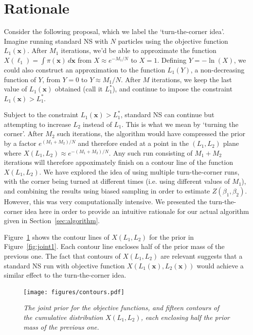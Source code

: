 \documentclass[journal,article,accept,moreauthors,pdftex,12pt,a4paper]{mdpi}
\newcommand{\xx}{\boldsymbol{x}}
\begin{document}
\section{Rationale}\label{sec:rationale}

Consider the following proposal, which we label the `turn-the-corner idea'.
Imagine running standard NS with $N$ particles
using the objective function $L_1(\xx)$.
After $M_1$ iterations, we'd be able to approximate
the function $X(\ell_1) = \int \pi(\xx) \, d\xx$
from $X\approx e^{-M_1/N}$ to $X=1$. Defining $Y=-\ln(X)$, we could also
construct an approximation to the function
$L_1(Y)$, a non-decreasing function of $Y$, from $Y=0$ to $Y\approx M_1/N$.
After $M$ iterations, we keep the last value of $L_1(\xx)$ obtained
(call it $L_1^*$), and continue to impose the constraint $L_1(\xx) > L_1^*$.

Subject to the constraint $L_1(\xx) > L_1^*$, standard NS can continue but
attempting to increase $L_2$ instead of $L_1$. This is what we mean by
`turning the corner'. After $M_2$ such iterations,
the algorithm would have compressed the prior by a factor
$e^{(M_1 + M_2)/N}$ and therefore ended at a point in the $(L_1, L_2)$ plane
where $X(L_1, L_2) \approx e^{-(M_1 + M_2)/N}$. Any such run consisting of
$M_1 + M_2$ iterations will therefore appoximately finish on a contour line
of the function $X(L_1, L_2)$.
We have explored the idea of using multiple turn-the-corner runs, with
the corner being turned at different times (i.e. using different values of
$M_1$), and combining the results using biased sampling
\citep{vardi, cameron} in order to estimate $Z(\beta_1, \beta_2)$. However,
this was very computationally intensive. We presented the turn-the-corner idea
here in order to provide an intuitive rationale for our actual algorithm given in
Section~\ref{sec:algorithm}.

Figure~\ref{fig:contours} shows the contour lines of $X(L_1, L_2)$ for the
prior in Figure~\ref{fig:joint1}. Each contour line encloses half of the
prior mass of the previous one. The fact that contours of $X(L_1, L_2)$ are
relevant suggests that a standard NS run with objective function
$X(L_1(\xx), L_2(\xx))$ would achieve a similar effect to the turn-the-corner
idea.

\begin{figure}
\centering
\texttt{[image: figures/contours.pdf]}
\caption{\it The joint prior for the objective functions, and fifteen
contours of the cumulative distribution $X(L_1, L_2)$, each enclosing half
the prior mass of the previous one. \label{fig:contours}}
\end{figure}
\end{document}
